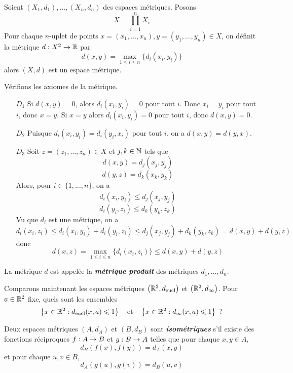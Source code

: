 \documentclass[french]{article}
\begin{document}
\begin{theoreme}
  Soient $(X_1, d_1), \dots, (X_n, d_n)$ des espaces métriques. Posons $$X = \prod_{i=1}^{n} X_i$$
  Pour chaque $n$-uplet de points $x = (x_1, \dots, x_n), y = (y_1, \dots, y_n) \in X$, on définit la métrique
  $d: X^2 \rightarrow \mathbb{R}$ par
  $$ d(x, y) = \max_{1 \leq i \leq n} \big\{ d_i(x_i, y_i)\big\}$$
  alors $(X, d)$ est un espace métrique.

  \tcblower
  \begin{preuve}
    Vérifions les axiomes de la métrique.
    \begin{itemize}
      \item[$D_1$] Si $d(x, y) = 0$, alors $d_i(x_i, y_i) = 0$ pour tout $i$. Donc $x_i = y_i$ pour tout $i$, donc $x = y$.
        \newline Si $x = y$ alors $d_i(x_i, y_i) = 0$ pour tout $i$, donc $d(x, y) = 0$.
      \item[$D_2$] Puisque $d_i(x_i, y_i) = d_i(y_i, x_i)$ pour tout $i$, on a $d(x, y) = d(y, x)$.
      \item[$D_3$] Soit $z = (z_1, \dots, z_n) \in X$ et $j, k \in \mathbb{N}$ tels que
        $$ d(x, y) = d_j(x_j, y_j) $$
        $$ d(y, z) = d_k(x_k, y_k)$$
        Alors, pour $i \in \{1, \dots, n\}$, on a
        $$d_i(x_i, y_i) \leq d_j(x_j, y_j)$$
        $$d_i(y_i, z_i) \leq d_k(y_k, z_k)$$
        Vu que $d_i$ est une métrique, on a
        $$d_i(x_i, z_i) \leq d_i(x_i, y_i) + d_i(y_i, z_i) \leq d_j(x_j, y_j) + d_k(y_k, z_k) = d(x, y) + d(y, z)$$
        donc 
        $$d(x, z) = \max_{1 \leq i \leq n} \big\{ d_i(x_i, z_i) \big\} \leq d(x, y) + d(y, z)$$
    \end{itemize}
  \end{preuve}
\end{theoreme}

\begin{remarque}
  La métrique $d$ est appelée la \textbf{\it métrique produit} des métriques $d_1, \dots, d_n$.
\end{remarque}

Comparons maintenant les espaces métriques $\left(\mathbb{R}^2, d_\text{eucl} \right)$ et $\left(\mathbb{R}^2, d_\infty \right)$. Pour $a \in \mathbb{R}^2$ fixe, quels sont les ensembles
$$ \left\{ x \in \mathbb{R}^2 : d_\text{eucl}(x, a) \leqslant 1 \right\} \quad \text{et} \quad \left\{ x \in \mathbb{R}^2 : d_\infty(x, a) \leqslant 1 \right\} \text{ ?}$$



\begin{definition}\label{def:isom}
  Deux espaces métriques $(A, d_A)$ et $(B, d_B)$ sont \textbf{\it isométriques} s'il existe des fonctions réciproques $f: A \rightarrow B$ et $g: B \rightarrow A$ telles que pour chaque $x, y \in A$,
  $$ d_B(f(x), f(y)) = d_A(x, y)$$
  et pour chaque $u, v \in B$,
  $$ d_A(g(u), g(v)) = d_B(u, v)$$
\end{definition}
\end{document}
